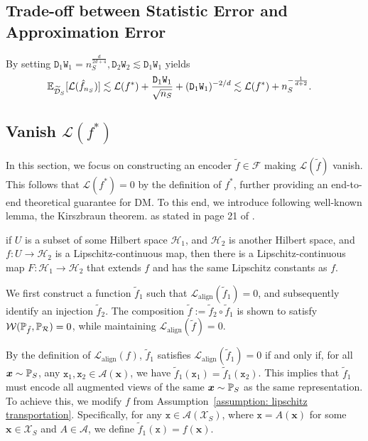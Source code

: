 \subsection{Trade-off between Statistic Error and Approximation Error}\label{subsection: Trade off between statistic error and approximation error}
By setting $\mathtt{D}_1\mathtt{W}_1 = n_S^{\frac{d}{2d+4}}, \mathtt{D}_2\mathtt{W}_2 \lesssim \mathtt{D}_1\mathtt{W}_1$ yields
\begin{align*}
    \E_{\widetilde{\mathcal{D}}_S}[\mathcal{L}(\hat{f}_{n_S})] &\lesssim  \mathcal{L}(f^*) + \frac{\mathtt{D}_1\mathtt{W}_1}{\sqrt{n_S}} + (\mathtt{D}_1\mathtt{W}_1)^{-2/d} \lesssim \mathcal{L}(f^*) + n_S^{-\frac{1}{d+2}}.
\end{align*}

\subsection{Vanish \texorpdfstring{$\mathcal{L}(f^*)$}{Vanish L(f*)}}\label{subsection: vanish L(f*)}
In this section, we focus on constructing an encoder $\tilde{f} \in \mathcal{F}$ making $\mathcal{L}(\tilde{f})$ vanish. This follows that $\mathcal{L}(f^*) = 0$ by the definition of $f^*$, further providing an end-to-end theoretical guarantee for DM. To this end, we introduce following well-known lemma, the Kirszbraun theorem. as stated in page 21 of \citet{schwartz1969nonlinear}.  
\begin{lemma}\label{lemma: kirszbraun theorem}
    if $U$ is a subset of some Hilbert space $\mathcal{H}_1$, and $\mathcal{H}_2$ is another Hilbert space, and $f: U \to \mathcal{H}_2$ is a Lipschitz-continuous map, then there is a Lipschitz-continuous map $F: \mathcal{H}_1 \to \mathcal{H}_2$ that extends $f$ and has the same Lipschitz constants as $f$.
\end{lemma}


We first construct a function $\tilde{f}_1$ such that $\mathcal{L}_{\mathrm{align}}(\tilde{f}_1) = 0$, and subsequently identify an injection $\tilde{f}_2$. The composition $\tilde{f} := \tilde{f}_2 \circ \tilde{f}_1$ is shown to satisfy $\mathcal{W}(\P_{\tilde{f}}, \P_\mathcal{R}) = 0$, while maintaining $\mathcal{L}_{\mathrm{align}}(\tilde{f}) = 0$.


By the definition of $\mathcal{L}_{\mathrm{align}}(f)$, 
$\tilde{f}_1$ satisfies $\mathcal{L}_{\mathrm{align}}(\tilde{f}_1) = 0$ if and only if, for all $\bm{x} \sim \P_S$, any $\mathtt{x}_1, \mathtt{x}_2 \in \mathcal{A}(\bm{x})$, we have $\tilde{f}_1(\mathtt{x}_1) = \tilde{f}_1(\mathtt{x}_2)$. This implies that $\tilde{f}_1$ must encode all augmented views of the same $\bm{x} \sim \P_S$ as the same representation. To achieve this, we modify $f$ from Assumption~\ref{assumption: lipschitz transportation}. Specifically, for any $\mathtt{x} \in \mathcal{A}(\mathcal{X}_S)$, where $\mathtt{x} = A(\bm{x})$ for some $\bm{x} \in \mathcal{X}_S$ and $A \in \mathcal{A}$, we define $\tilde{f}_1(\mathtt{x}) = f(\bm{x})$. 


